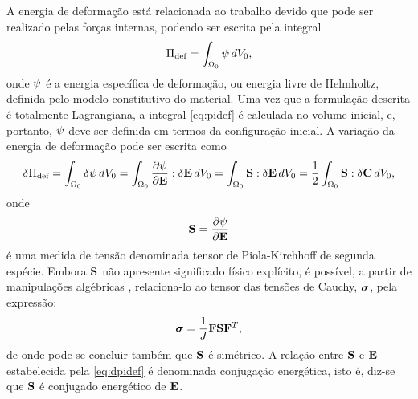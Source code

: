 \documentclass[Tese.tex]{subfiles}
\begin{document}
A energia de deformação está relacionada ao trabalho devido que pode ser realizado pelas forças internas, podendo ser escrita pela integral
\begin{equation}\label{eq:pidef}
\Energiadef = \int_{\domVoli}\helmholtz\,d\voli,
\end{equation}
onde $\helmholtz$ é a energia específica de deformação, ou energia livre de Helmholtz, definida pelo modelo constitutivo do material. Uma vez que a formulação descrita é totalmente Lagrangiana, a integral \eqref{eq:pidef} é calculada no volume inicial, e, portanto, $\helmholtz$ deve ser definida em termos da configuração inicial. A variação da energia de deformação pode ser escrita como
\begin{equation}\label{eq:dpidef}
\delta\Energiadef = \int_{\domVoli}\delta\helmholtz\,d\voli = \int_{\domVoli}\dfrac{\partial\helmholtz}{\partial\E}:\delta\E\,d\voli = \int_{\domVoli}\S:\delta\E\,d\voli = \dfrac{1}{2}\int_{\domVoli}\S:\delta\C\,d\voli,
\end{equation}
onde 
\begin{equation}\label{eq:S}
\S=\dfrac{\partial \helmholtz}{\partial\E}
\end{equation}
é uma medida de tensão denominada tensor de Piola-Kirchhoff de segunda espécie. Embora $\S$ não apresente significado físico explícito, é possível, a partir de manipulações algébricas \cite{CodaLivro}, relaciona-lo ao tensor das tensões de Cauchy, $\cauchy$, pela expressão:
\begin{equation}\label{eq:cauchy}
\cauchy = \dfrac{1}{\J}\F\S\F^T,
\end{equation}	
de onde pode-se concluir também que $\S$ é simétrico. A relação entre $\S$ e $\E$ estabelecida pela \cref{eq:dpidef} é denominada conjugação energética, isto é, diz-se que $\S$ é conjugado energético de $\E$. %

\end{document}
